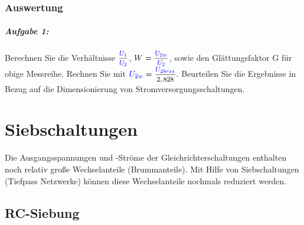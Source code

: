 \documentclass[11pt,a4paper,titlepage,parskip=half]{scrreprt}
\begin{document}
			\subsection{Auswertung}
			\paragraph{Aufgabe 1:}  Berechnen Sie die Verhältnisse $\mfrac{\spannung{U_1}}{\spannung{U_2}}$, $W =\mfrac{\spannung{U_{2w}}}{\spannung{U_2}}$, sowie den Glättungsfaktor G für obige Messreihe. Rechnen Sie mit $\spannung{U_{2w}} = \mfrac{\spannung{U_{2brss}}}{2,828}$. Beurteilen Sie die Ergebnisse in Bezug auf die Dimensionierung von Stromversorgungsschaltungen.\\
            
            
	\chapter{Siebschaltungen}
    Die Ausgangsspannungen und -Ströme der Gleichrichterschaltungen enthalten noch relativ große Wechselanteile (Brummanteile). Mit Hilfe von Siebschaltungen (Tiefpass Netzwerke) können diese Wechselanteile nochmals reduziert werden.
    	\section{RC-Siebung}
\end{document}
